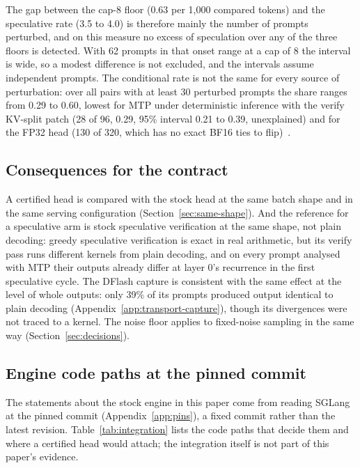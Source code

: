 The gap between the cap-8 floor (0.63 per 1,000 compared tokens) and the speculative rate (3.5 to 4.0) is therefore mainly the number of prompts perturbed, and on this measure no excess of speculation over any of the three floors is detected. With 62 prompts in that onset range at a cap of 8 the interval is wide, so a modest difference is not excluded, and the intervals assume independent prompts. The conditional rate is not the same for every source of perturbation: over all pairs with at least 30 perturbed prompts the share ranges from 0.29 to 0.60, lowest for MTP under deterministic inference with the verify KV-split patch (28 of 96, 0.29, 95\% interval 0.21 to 0.39, unexplained) and for the FP32 head (130 of 320, which has no exact BF16 ties to flip)~.

\subsection{Consequences for the contract}\label{app:divergence-consequences}
A certified head is compared with the stock head at the same batch shape and in the same serving configuration (Section~\ref{sec:same-shape}). And the reference for a speculative arm is stock speculative verification at the same shape, not plain decoding: greedy speculative verification is exact in real arithmetic, but its verify pass runs different kernels from plain decoding, and on every prompt analysed with MTP their outputs already differ at layer 0's recurrence in the first speculative cycle. The DFlash capture is consistent with the same effect at the level of whole outputs: only 39\% of its prompts produced output identical to plain decoding (Appendix~\ref{app:transport-capture}), though its divergences were not traced to a kernel. The noise floor applies to fixed-noise sampling in the same way (Section~\ref{sec:decisions}).

\subsection{Engine code paths at the pinned commit}\label{app:integration}
The statements about the stock engine in this paper come from reading SGLang at the pinned commit (Appendix~\ref{app:pins}), a fixed commit rather than the latest revision. Table~\ref{tab:integration} lists the code paths that decide them and where a certified head would attach; the integration itself is not part of this paper's evidence.

